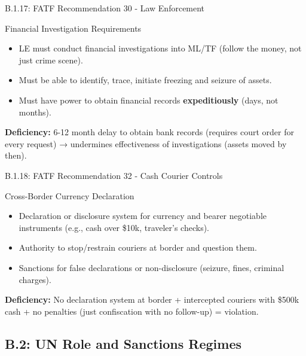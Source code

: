 \documentclass{beamer}
\begin{document}
	\begin{frame}{B.1.17: FATF Recommendation 30 - Law Enforcement}
		\begin{block}{Financial Investigation Requirements}
			\begin{itemize}
				\item LE must conduct financial investigations into ML/TF (follow the money, not just crime scene).
				\item Must be able to identify, trace, initiate freezing and seizure of assets.
				\item Must have power to obtain financial records \textbf{expeditiously} (days, not months).
			\end{itemize}
		\end{block}
		\textbf{Deficiency:} 6-12 month delay to obtain bank records (requires court order for every request) → undermines effectiveness of investigations (assets moved by then).
	\end{frame}
	
	\begin{frame}{B.1.18: FATF Recommendation 32 - Cash Courier Controls}
		\begin{block}{Cross-Border Currency Declaration}
			\begin{itemize}
				\item Declaration or disclosure system for currency and bearer negotiable instruments (e.g., cash over \$10k, traveler's checks).
				\item Authority to stop/restrain couriers at border and question them.
				\item Sanctions for false declarations or non-disclosure (seizure, fines, criminal charges).
			\end{itemize}
		\end{block}
		\textbf{Deficiency:} No declaration system at border + intercepted couriers with \$500k cash + no penalties (just confiscation with no follow-up) = violation.
	\end{frame}
	
	\subsection{B.2: UN Role and Sanctions Regimes}
	
\end{document}
